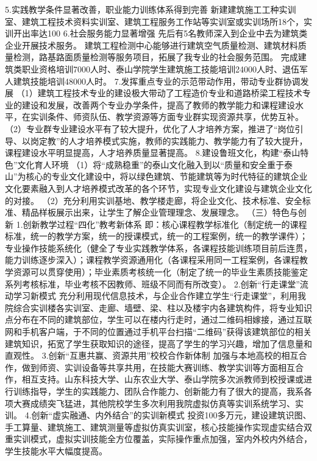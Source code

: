 5.实践教学条件显著改善，职业能力训练体系得到完善
新建建筑施工工种实训室、建筑工程技术资料实训室、建筑工程服务工作站等实训室或实训场所18个，实训开出率达100%
6.社会服务能力显著增强
先后有5名教师深入到企业中去为建筑类企业开展技术服务。
建筑工程检测中心能够进行建筑空气质量检测、建筑材料质量检测，路基路面质量检测等服务项目，拓展了我专业的社会服务范围。
完成建筑类职业资格培训7000人时、泰山学院学生建筑施工技能培训24000人时、退伍军人建筑技能培训48000人时。
7.发挥重点专业的示范带动作用，带动专业群协调发展
（1）建筑工程技术专业的建设极大带动了工程造价专业和道路桥梁工程技术专业的建设和发展，改善两个专业办学条件，提高了教师的教学能力和课程建设水平，在实训条件、师资队伍、教学资源等方面专业群实现资源共享，优势互补。
（2）专业群专业建设水平有了较大提升，优化了人才培养方案，推进了“岗位引导、以岗定教”的人才培养模式实施，教师的实践能力、教学能力有了较大提升，课程建设水平明显提高，人才培养质量显著提高。
8.建设鲁班文化，构建“泰山特色”文化育人环境
（1）将“成熟稳重”的泰山文化融入到以“质量和安全重于泰山”为核心的专业文化建设中，将以绿色建筑、节能建筑等为时代特征的建筑企业文化要素融入到人才培养模式改革的各个环节，实现专业文化建设与建筑企业文化的对接。
（2）充分利用实训基地、教学楼走廊，将企业文化、技术标准、安全标准、精品样板展示出来，让学生了解企业管理理念、发展理念。
（三）特色与创新
1.创新教学过程“四化”教考新体系
即：核心课程教学标准化（制定统一的课程标准，统一的教学方案，统一的授课模式，统一的工程案例，统一的教学课件）；专业操作技能系统化（健全了专业实践教学体系，各课程技能训练项目前后连贯，能力训练逐步深入）；课程教学资源通用化（各课程采用同一工程案例，各课程教学资源可以贯穿使用）；毕业素质考核统一化（制定了统一的毕业生素质技能鉴定系列考核标准，毕业考核不因教师、班级不同而有所改变）。
2.创新“行走课堂”流动学习新模式
充分利用现代信息技术，与企业合作建立学生“行走课堂”，利用我院综合实训楼各实训室、走廊、墙壁、梁、柱以及楼宇内各建筑构件，将专业知识点分布在不同的建筑部位，学生可以在楼内行走时，通过二维码相嫁接，通过互联网和手机客户端，于不同的位置通过手机平台扫描“二维码”获得该建筑部位的相关建筑知识，拓宽了学生获取知识的途径，提高了学生的学习兴趣，增加了信息量和直观性。
3.创新“互惠共赢、资源共用”校校合作新体制
加强与本地高校的相互合作，做到师资、实训设备等共享共用，在技能大赛训练、教学实训等方面相互合作，相互支持。山东科技大学、山东农业大学、泰山学院多次派教师到校授课或进行训练指导，学生的实践能力、团队合作能力、创新能力有了很大的提高，我系各项大赛成绩突飞猛进，其他院校学生多次利用我院虚拟仿真等实训系统学习、实训。
4.创新“虚实融通、内外结合”的实训新模式
投资100多万元，建设建筑识图、手工算量、建筑施工、建筑测量等虚拟仿真实训室，核心技能操作实现虚实结合双重实训模式，虚拟实训技能全方位覆盖，实际操作重点加强，室内外校内外结合，学生技能水平大幅度提高。

